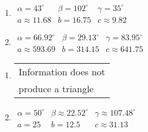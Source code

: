 \begin{multicols}{2} 

\begin{enumerate}

\setcounter{enumi}{\value{HW}}

\item $\begin{array}{lll}
\alpha = 43^{\circ} & \beta = 102^{\circ} & \gamma = 35^{\circ} \\
a \approx 11.68 & b = 16.75 & c \approx 9.82 \end{array}$

\item $\begin{array}{lll}
\alpha = 66.92^{\circ} & \beta = 29.13^{\circ} & \gamma = 83.95^{\circ} \\
a \approx 593.69 & b = 314.15 & c \approx 641.75 \end{array}$

\setcounter{HW}{\value{enumi}}

\end{enumerate}

\end{multicols}

\begin{multicols}{2} 

\begin{enumerate}

\setcounter{enumi}{\value{HW}}

\item \begin{tabular}{l}
Information does not \\
produce a triangle \end{tabular}

\item $\begin{array}{lll}
\alpha = 50^{\circ} & \beta \approx 22.52^{\circ} & \gamma \approx 107.48^{\circ} \\
a = 25 & b = 12.5 & c \approx 31.13 \end{array}$

\setcounter{HW}{\value{enumi}}

\end{enumerate}

\end{multicols}

